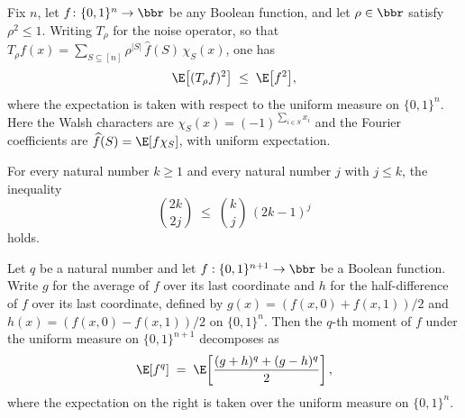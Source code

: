 \begin{theorem}
\leanok
{}
\label{BooleanAnalysis.Hypercontractivity.contractivity}
Fix $n$, let $f\colon\{0,1\}^n\to\bbr$ be any Boolean function, and let $\rho\in\bbr$
satisfy $\rho^2\le 1$. Writing $T_\rho$ for the noise operator, so that $T_\rho
f(x)=\sum_{S\subseteq[n]}\rho^{|S|}\,\hat f(S)\,\chi_S(x)$, one has
\[
  \E\big[(T_\rho f)^2\big]\;\le\;\E\big[f^2\big],
\]
where the expectation is taken with respect to the uniform measure on $\{0,1\}^n$. Here
the Walsh characters are $\chi_S(x)=(-1)^{\sum_{i\in S}x_i}$ and the Fourier
coefficients are $\widehat f(S)=\E[f\chi_S]$, with uniform expectation.
\end{theorem}

\begin{lemma}
\leanok
{}
\label{BooleanAnalysis.Hypercontractivity.binom_coeff_ineq}
For every natural number $k \ge 1$ and every natural number $j$ with $j \le k$, the
inequality
\[
  \binom{2k}{2j} \;\le\; \binom{k}{j}\,(2k-1)^{j}
\]
holds.
\end{lemma}

\begin{lemma}
\leanok
{}
\label{BooleanAnalysis.Hypercontractivity.qth_moment_decomp}
Let $q$ be a natural number and let $f:\{0,1\}^{n+1}\to\bbr$ be a Boolean function.
Write $g$ for the average of $f$ over its last coordinate and $h$ for the
half-difference of $f$ over its last coordinate, defined by
$g(x)=(f(x,0)+f(x,1))/2$ and $h(x)=(f(x,0)-f(x,1))/2$
on $\{0,1\}^n$.
Then the $q$-th moment of $f$ under the uniform measure on $\{0,1\}^{n+1}$ decomposes as
\[
  \E[f^q] \;=\; \E\!\left[\frac{(g+h)^q + (g-h)^q}{2}\right],
\]
where the expectation on the right is taken over the uniform measure on $\{0,1\}^n$.
\end{lemma}

